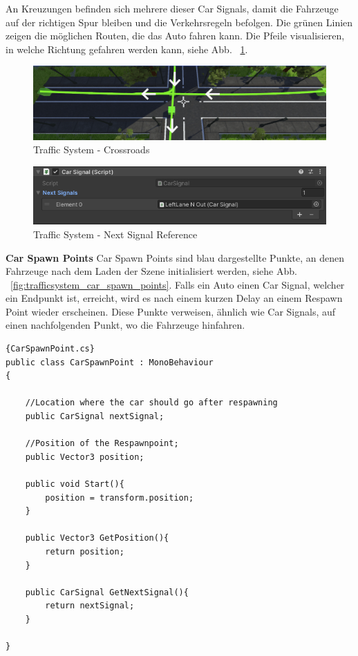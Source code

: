 An Kreuzungen befinden sich mehrere dieser Car Signals, damit die Fahrzeuge auf der richtigen Spur bleiben und die Verkehrsregeln befolgen.
Die gr\"unen Linien zeigen die m\"oglichen Routen, die das Auto fahren kann.
Die Pfeile visualisieren, in welche Richtung gefahren werden kann, siehe Abb. ~\ref{fig:trafficsystem_crossroads}.


\begin{figure}
    \centering
    \includegraphics[scale=0.5]{pics/trafficsystem_carsignal_crossroads}
    \caption{Traffic System - Crossroads}
    \label{fig:trafficsystem_crossroads}
\end{figure}

\begin{figure}
    \centering
    \includegraphics[scale=0.7]{pics/trafficsystem_carsignal_signal_reference}
    \caption{Traffic System - Next Signal Reference}
    \label{fig:trafficsystem_next_signal_reference}
\end{figure}


\textbf{Car Spawn Points}
Car Spawn Points sind blau dargestellte Punkte, an denen Fahrzeuge nach dem Laden der Szene initialisiert werden, siehe Abb. ~\ref{fig:trafficsystem_car_spawn_points}.
Falls ein Auto einen Car Signal, welcher ein Endpunkt ist, erreicht, wird es nach einem kurzen Delay an einem Respawn Point wieder erscheinen.
Diese Punkte verweisen, \"ahnlich wie Car Signals, auf einen nachfolgenden Punkt, wo die Fahrzeuge hinfahren.

\begin{lstlisting}{CarSpawnPoint.cs}
public class CarSpawnPoint : MonoBehaviour
{

    //Location where the car should go after respawning
    public CarSignal nextSignal;

    //Position of the Respawnpoint;
    public Vector3 position;

    public void Start(){
        position = transform.position;
    }

    public Vector3 GetPosition(){
        return position;
    }

    public CarSignal GetNextSignal(){
        return nextSignal;
    }

}
\end{lstlisting}

